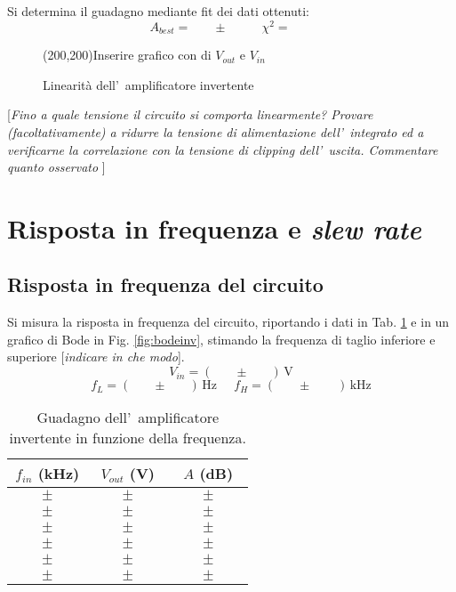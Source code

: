 \documentclass[10pt,a4paper]{article}
\newcommand{\rem}[1]{[\emph{#1}]}
\newcommand{\exn}{\phantom{xxx}}
\begin{document}
Si determina il guadagno mediante fit dei dati ottenuti:
\[
A_{best} = \exn \pm \exn \quad  \chi^2 = \exn
\]
\begin{figure}[t]
\begin{center}
\framebox(200,200){Inserire grafico con di $V_{out}$ e $V_{in}$}
\end{center}
\caption{\small Linearit\`a dell'~amplificatore invertente}
\label{fig:lin}
\end{figure}
%

\rem{Fino a quale tensione il circuito si comporta linearmente? Provare (facoltativamente) a ridurre la 
tensione di alimentazione dell'~integrato ed a verificarne la correlazione con la tensione di 
\emph{clipping} dell'~uscita. Commentare quanto osservato }

%
\section{Risposta in frequenza e \emph{slew rate}}
\subsection{Risposta in frequenza del circuito}
Si misura la risposta in frequenza del circuito, riportando i dati  in Tab. \ref{tab:bodeinv} e
in un grafico di Bode in Fig. \ref{fig:bodeinv}, stimando la frequenza di taglio inferiore e 
superiore \rem{indicare in che modo}.
\[
V_{in} = (\exn \pm \exn )\,\mathrm{V}
\]
\[
f_L = (\exn \pm \exn )\,\mathrm{Hz}\;\;\;\;\;f_H = (\exn \pm \exn \;)\,\mathrm{kHz}
\]
\begin{table}[h]
\caption{\small Guadagno dell'~amplificatore invertente in funzione della frequenza.}
\label{tab:bodeinv}
\begin{center}
\begin{tabular}{|c|c|c|}
\hline
$f_{in}$ (kHz) & $V_{out}$ (V) & $A$ (dB) \\
\hline
$\exn \pm \exn $ & $\exn \pm \exn $ & $\exn \pm \exn $\\
\hline
$\exn \pm \exn $ & $\exn \pm \exn $ & $\exn \pm \exn $\\
\hline
$\exn \pm \exn $ & $\exn \pm \exn $ & $\exn \pm \exn $\\
\hline
$\exn \pm \exn $ & $\exn \pm \exn $ & $\exn \pm \exn $\\
\hline
$\exn \pm \exn $ & $\exn \pm \exn $ & $\exn \pm \exn $\\
\hline
$\exn \pm \exn $ & $\exn \pm \exn $ & $\exn \pm \exn $\\
\hline
\end{tabular}
\end{center}
\end{table} 
\end{document}
